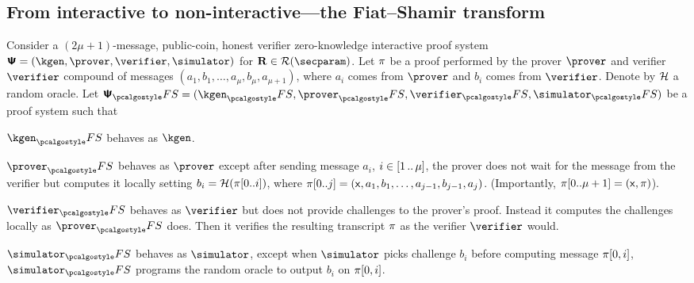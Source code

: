 
\subsection{From interactive to non-interactive---the Fiat--Shamir transform}
Consider a $(2\mu + 1)$-message, public-coin, honest verifier zero-knowledge
interactive proof system
$\proofsystem = (\kgen, \prover, \verifier, \simulator)$ for
$\REL \in \RELGEN(\secparam)$.  Let $\pi$ be a proof performed by the
prover $\prover$ and verifier $\verifier$ compound of messages
$(a_1, b_1, \ldots, a_{\mu}, b_{\mu}, a_{\mu + 1})$, where $a_i$ comes from
$\prover$ and $b_i$ comes from $\verifier$.  Denote by $\mathcal{H}$ a random oracle.
Let $\proofsystem_\fs = (\kgen_\fs, \prover_\fs, \verifier_\fs, \simulator_\fs)$
be a proof system such that
\begin{compactitem}
  \item $\kgen_\fs$ behaves as $\kgen$.
  \item $\prover_\fs$ behaves as $\prover$ except after sending message
    $a_i$, $i \in [1 \, .. \, \mu]$, the prover does not wait for
    the message from the verifier but computes it locally setting $b_i
    = \mathcal{H}(\pi[0..i])$, where $\pi[0..j] = (\mathsf{x}, a_1, b_1, \ldots,
    a_{j - 1}, b_{j - 1}, a_j)$. (Importantly, $\pi[0..\mu + 1] =
    (\mathsf{x}, \pi)$).
  \item $\verifier_\fs$ behaves as $\verifier$ but does not provide
    challenges to the prover's proof. Instead it computes the
    challenges locally as $\prover_\fs$ does. Then it verifies the
    resulting transcript $\pi$ as the verifier $\verifier$ would. 
  \item $\simulator_\fs$ behaves as $\simulator$, except when
    $\simulator$ picks challenge $b_i$ before computing message $\pi[0, i]$, $\simulator_\fs$ programs the
    random oracle to output $b_i$ on $\pi[0, i]$.
  \end{compactitem}

